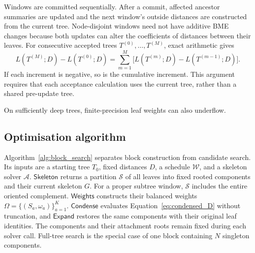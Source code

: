 \documentclass[11pt,a4paper]{article}
\makeatletter
\newcommand{\proc}[1]{\mathsf{#1}}
\DeclareRobustCommand{\_}{\ifmmode\nfss@text{\textunderscore}\else\textunderscore\allowbreak\fi}
\theoremstyle{definition}
\makeatother
\begin{document}
Windows are committed sequentially.
After a commit, affected ancestor summaries are updated and the next window's outside distances are constructed from the current tree.
Node-disjoint windows need not have additive BME changes because both updates can alter the coefficients of distances between their leaves.
For consecutive accepted trees $T^{(0)},\ldots,T^{(M)}$, exact arithmetic gives
\begin{equation}
 L(T^{(M)};D)-L(T^{(0)};D)
 =\sum_{m=1}^M\bigl[L(T^{(m)};D)-L(T^{(m-1)};D)\bigr].
 \label{eq:telescoping}
\end{equation}
If each increment is negative, so is the cumulative increment.
This argument requires that each acceptance calculation uses the current tree, rather than a shared pre-update tree.

On sufficiently deep trees, finite-precision leaf weights can also underflow.

\subsection{Optimisation algorithm}
\label{sec:optimizer}

Algorithm~\ref{alg:block_search} separates block construction from candidate search.
Its inputs are a starting tree $T_0$, fixed distances $D$, a schedule $\mathcal W$, and a skeleton solver $\mathcal A$.
$\proc{Skeleton}$ returns a partition $\mathcal S$ of all leaves into fixed rooted components and their current skeleton $G$.
For a proper subtree window, $\mathcal S$ includes the entire oriented complement.
$\proc{Weights}$ constructs their balanced weights $\Omega=\{(S_a,\omega_a)\}_{a=1}^K$.
$\proc{Condense}$ evaluates Equation~\eqref{eq:condensed_D} without truncation, and $\proc{Expand}$ restores the same components with their original leaf identities.
The components and their attachment roots remain fixed during each solver call.
Full-tree search is the special case of one block containing $N$ singleton components.
\end{document}
